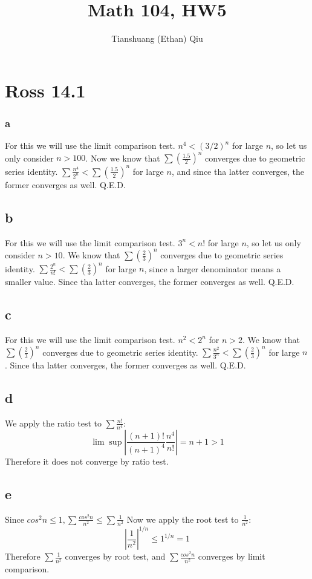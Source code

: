 \documentclass[12pt]{article}
\author{Tianshuang (Ethan) Qiu}
\begin{document}
\title{Math 104, HW5}
\maketitle
\newpage

\section{Ross 14.1}
\subsubsection{a}
For this we will use the limit comparison test. $n^4 < (3/2)^n$ for large $n$, so let us only consider $n>100$. Now we know that $\sum (\frac{1.5}{2})^n$ converges due to geometric series identity.
\newline
$\sum \frac{n^4}{2^n} < \sum (\frac{1.5}{2})^n$ for large $n$, and since tha latter converges, the former converges as well. Q.E.D.

\subsection{b}
For this we will use the limit comparison test. $3^n < n!$ for large $n$, so let us only consider $n>10$. We know that $\sum (\frac{2}{3})^n$ converges due to geometric series identity.
\newline
$\sum \frac{2^n}{n!} < \sum (\frac{2}{3})^n$ for large $n$, since a larger denominator means a smaller value. Since tha latter converges, the former converges as well. Q.E.D.

\subsection{c}
For this we will use the limit comparison test. $n^2 < 2^n$ for $n>2$. We know that $\sum (\frac{2}{3})^n$ converges due to geometric series identity.
\newline
$\sum \frac{n^2}{3^n} < \sum (\frac{2}{3})^n$ for large $n$. Since tha latter converges, the former converges as well. Q.E.D.

\subsection{d}
We apply the ratio test to $\sum \frac{n!}{n^4}$:
$$\lim \sup |\frac{(n+1)!}{(n+1)^4}\frac{n^4}{n!}| = n+1 > 1$$
Therefore it does not converge by ratio test.

\subsection{e}
Since $cos^2n \leq 1, \sum \frac{cos^2n}{n^2} \leq \sum \frac{1}{n^2}$
\newline
Now we apply the root test to $\frac{1}{n^2}$:
$$|\frac{1}{n^2}|^{1/n} \leq 1^{1/n} = 1$$
Therefore $\sum \frac{1}{n^2}$ converges by root test, and $\sum \frac{cos^2n}{n^2}$ converges by limit comparison.
\end{document}
